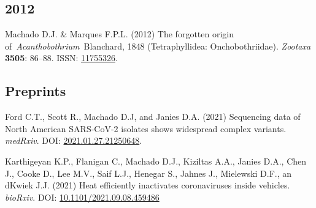 \documentclass[11pt, letterpaper, sans]{moderncv}
\begin{document}

\subsection{2012}

    {\setlength{\parskip}{.5em}\renewcommand{\baselinestretch}{2.0}\begin{hangparas}{.25in}{1}
		Machado D.J. \& Marques F.P.L. (2012) The forgotten origin of~\emph{Acanthobothrium}~Blanchard, 1848 (Tetraphyllidea: Onchobothriidae). \emph{Zootaxa} \textbf{3505}: 86--88. ISSN: \href{http://www.mapress.com/zootaxa/2012/f/z03505p088f.pdf}{11755326}.
	\end{hangparas}}


%


\subsection{Preprints}

	{
		\setlength{\parskip}{.5em}\renewcommand{\baselinestretch}{2.0}
		\begin{hangparas}{.25in}{1}

		Ford C.T., Scott R.,  Machado D.J, and  Janies D.A. (2021) Sequencing data of North American SARS-CoV-2 isolates shows widespread complex variants. \textit{medRxiv}. DOI: \href{https://doi.org/10.1101/2021.01.27.21250648}{2021.01.27.21250648}.

		Karthigeyan K.P., Flanigan C., Machado D.J., Kiziltas A.A., Janies D.A., Chen J., Cooke D., Lee M.V., Saif L.J., Henegar S., Jahnes J., Mielewski D.F., an dKwiek J.J. (2021) Heat efficiently inactivates coronaviruses inside vehicles. \textit{bioRxiv}. DOI: \href{https://doi.org/10.1101/2021.09.08.459486}{10.1101/2021.09.08.459486}

		\end{hangparas}
	}

\end{document}
